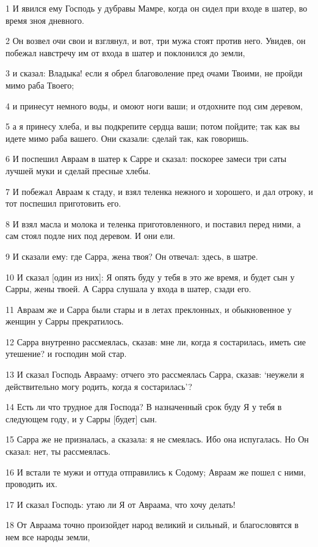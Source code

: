 \par 1 И явился ему Господь у дубравы Мамре, когда он сидел при входе в шатер, во время зноя дневного.
\par 2 Он возвел очи свои и взглянул, и вот, три мужа стоят против него. Увидев, он побежал навстречу им от входа в шатер и поклонился до земли,
\par 3 и сказал: Владыка! если я обрел благоволение пред очами Твоими, не пройди мимо раба Твоего;
\par 4 и принесут немного воды, и омоют ноги ваши; и отдохните под сим деревом,
\par 5 а я принесу хлеба, и вы подкрепите сердца ваши; потом пойдите; так как вы идете мимо раба вашего. Они сказали: сделай так, как говоришь.
\par 6 И поспешил Авраам в шатер к Сарре и сказал: поскорее замеси три саты лучшей муки и сделай пресные хлебы.
\par 7 И побежал Авраам к стаду, и взял теленка нежного и хорошего, и дал отроку, и тот поспешил приготовить его.
\par 8 И взял масла и молока и теленка приготовленного, и поставил перед ними, а сам стоял подле них под деревом. И они ели.
\par 9 И сказали ему: где Сарра, жена твоя? Он отвечал: здесь, в шатре.
\par 10 И сказал [один из них]: Я опять буду у тебя в это же время, и будет сын у Сарры, жены твоей. А Сарра слушала у входа в шатер, сзади его.
\par 11 Авраам же и Сарра были стары и в летах преклонных, и обыкновенное у женщин у Сарры прекратилось.
\par 12 Сарра внутренно рассмеялась, сказав: мне ли, когда я состарилась, иметь сие утешение? и господин мой стар.
\par 13 И сказал Господь Аврааму: отчего это рассмеялась Сарра, сказав: `неужели я действительно могу родить, когда я состарилась'?
\par 14 Есть ли что трудное для Господа? В назначенный срок буду Я у тебя в следующем году, и у Сарры [будет] сын.
\par 15 Сарра же не призналась, а сказала: я не смеялась. Ибо она испугалась. Но Он сказал: нет, ты рассмеялась.
\par 16 И встали те мужи и оттуда отправились к Содому; Авраам же пошел с ними, проводить их.
\par 17 И сказал Господь: утаю ли Я от Авраама, что хочу делать!
\par 18 От Авраама точно произойдет народ великий и сильный, и благословятся в нем все народы земли,
